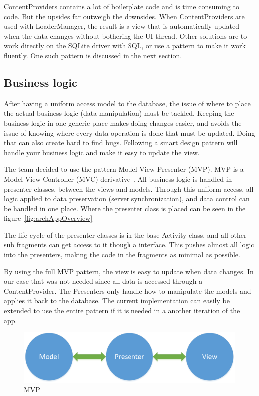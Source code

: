 ContentProviders contains a lot of boilerplate code and is time consuming to code. But the upsides far outweigh the downsides. When ContentProviders are used with LoaderManager, the result is a view that is automatically updated when the data changes without bothering the UI thread. Other solutions are to work directly on the SQLite driver with SQL, or use a pattern to make it work fluently. One such pattern is discussed in the next section. 

\subsection{Business logic}
After having a uniform access model to the database, the issue of where to place the actual business logic (data manipulation) must be tackled. Keeping the business logic in one generic place makes doing changes easier, and avoids the issue of knowing where every data operation is done that must be updated. Doing that can also create hard to find bugs. Following a smart design pattern will handle your business logic and make it easy to update the view. 

The team decided to use the pattern Model-View-Presenter (MVP). MVP is a Model-View-Controller (MVC) derivative~\cite{mvc}. All business logic is handled in presenter classes, between the views and models. Through this uniform access, all logic applied to data preservation (server synchronization), and data control can be handled in one place. Where the presenter class is placed can be seen in the figure~\ref{fig:archAppOverview}

The life cycle of the presenter classes is in the base Activity class, and all other sub fragments can get access to it though a interface. 
This pushes almost all logic into the presenters, making the code in the fragments as minimal as possible. 

By using the full MVP pattern, the view is easy to update when data changes. In our case that was not needed since all data is accessed through a ContentProvider. The Presenters only handle how to manipulate the models and applies it back to the database. The current implementation can easily be extended to use the entire pattern if it is needed in a another iteration of the app.  

\begin{figure}[H]
\includegraphics[width=\textwidth]{ch/architecture/fig/mvp.png}
\caption{MVP}
\label{fig:mvp}
\end{figure}

